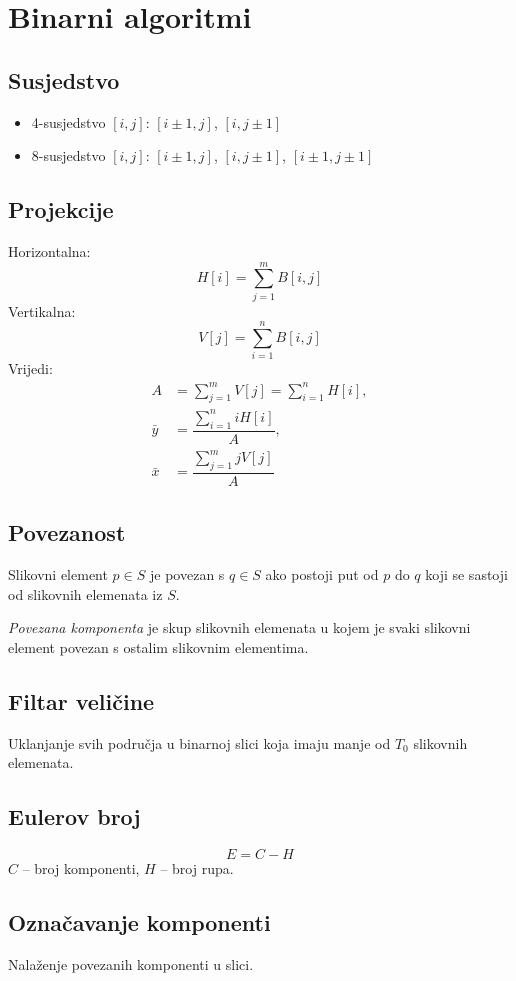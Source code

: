 \documentclass[11pt,english]{article}
\begin{document}
\section{Binarni algoritmi}
\subsection{Susjedstvo}
\begin{itemize}
  \item 4-susjedstvo $[i,j]$: $[i\pm 1, j]$, $[i,j\pm 1]$
  \item 8-susjedstvo $[i,j]$: $[i\pm 1, j]$, $[i,j\pm 1]$, $[i\pm 1, j\pm 1]$
\end{itemize}

\subsection{Projekcije}
Horizontalna:
  $$H[i] = \sum\limits^m_{j=1}B[i,j]$$
Vertikalna:
  $$V[j] = \sum\limits^n_{i=1}B[i,j]$$
Vrijedi:
  \begin{align*}
    A &= \sum\limits^m_{j=1}V[j] = \sum\limits^n_{i=1}H[i],\\
    \bar y &= \dfrac{\sum\limits^n_{i=1} i H[i]}{A},\\
    \bar x &= \dfrac{\sum\limits^m_{j=1} j V[j]}{A}
  \end{align*}

\subsection{Povezanost}
Slikovni element $p\in S$ je povezan s $q \in S$ ako postoji put od $p$ do $q$ koji se sastoji od slikovnih elemenata iz $S$.

\emph{Povezana komponenta} je skup slikovnih elemenata u kojem je svaki slikovni element povezan s ostalim slikovnim elementima.

\subsection{Filtar veličine}
Uklanjanje svih područja u binarnoj slici koja imaju manje od $T_0$ slikovnih elemenata.

\subsection{Eulerov broj}
$$E=C-H$$
$C$ -- broj komponenti,
$H$ -- broj rupa.

\subsection{Označavanje komponenti}
Nalaženje povezanih komponenti u slici.
\end{document}
